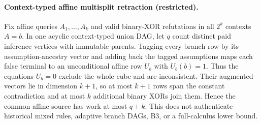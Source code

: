 \paragraph{Context-typed affine multisplit retraction (restricted).}
Fix affine queries $A_1,\ldots,A_k$ and valid binary-XOR refutations in
all $2^k$ contexts $A=b$.  In one acyclic context-typed union DAG, let $q$
count distinct paid inference vertices with immutable parents.  Tagging every
branch row by its assumption-ancestry vector and adding back the tagged
assumptions maps each false terminal to an unconditional affine row $U_b$
with $U_b(b)=1$.  Thus the equations $U_b=0$ exclude the whole cube and are
inconsistent.  Their augmented vectors lie in dimension $k+1$, so at most
$k+1$ rows span the constant contradiction and at most $k$ additional binary
XORs join them.  Hence the common affine source has work at most $q+k$.
This does not authenticate historical mixed rules, adaptive branch DAGs, B3,
or a full-calculus lower bound.
